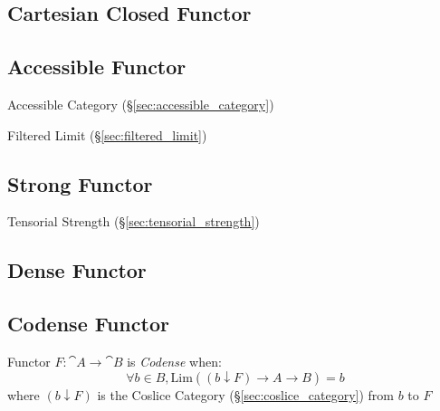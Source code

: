 \subsection{Cartesian Closed Functor}
\label{sec:cartesian_closed_functor}

\subsection{Accessible Functor}\label{sec:accessible_functor}

Accessible Category (\S\ref{sec:accessible_category})

Filtered Limit (\S\ref{sec:filtered_limit})



\subsection{Strong Functor}\label{sec:strong_functor}

Tensorial Strength (\S\ref{sec:tensorial_strength})



\subsection{Dense Functor}\label{sec:dense_functor}

\subsection{Codense Functor}\label{sec:codense_functor}

Functor $F : \cat{A} \rightarrow \cat{B}$ is \emph{Codense} when:
\[
  \forall b \in B,
  \mathrm{Lim}((b \downarrow F) \rightarrow A \rightarrow B) = b
\]
where $(b \downarrow F)$ is the Coslice Category
(\S\ref{sec:coslice_category}) from $b$ to $F$


